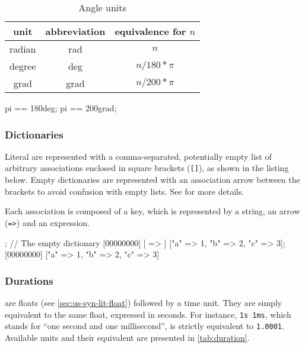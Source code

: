 \begin{table}[\floatposh]
  \centering
  \begin{tabular}{|c|c|c|}
    \hline
    unit        & abbreviation & equivalence for $n$  \\
    \hline
    radian      & rad          & $n$         \\
    degree      & deg          & $n / 180 * \pi$        \\
    grad        & grad         & $n / 200 * \pi$        \\
    \hline
  \end{tabular}
  \caption{Angle units}
  \label{tab:angle}
\end{table}

\begin{urbiassert}
pi == 180deg;
pi == 200grad;
\end{urbiassert}

\subsubsection{Dictionaries}
\label{sec:us-syn-lit-dictionary}

Literal  are represented with a comma-separated,
potentially empty list of arbitrary associations enclosed in square brackets
(\lstinline|[]|), as shown in the listing below.  Empty dictionaries are
represented with an association arrow between the brackets to avoid
confusion with empty lists.  See  for more details.

Each association is composed of a key, which is represented by a string, an
arrow (\lstinline|=>|) and an expression.

\begin{urbiscript}
[ => ]; // The empty dictionary
[00000000] [ => ]
["a" => 1, "b" => 2, "c" => 3];
[00000000] ["a" => 1, "b" => 2, "c" => 3]
\end{urbiscript}

\subsubsection{Durations}

 are floats (see \autoref{sec:us-syn-lit-float})
followed by a time unit. They are simply equivalent to the same float,
expressed in seconds. For instance, \lstinline|1s 1ms|, which stands
for ``one second and one millisecond'', is strictly equivalent to
\lstinline|1.0001|. Available units and their equivalent are presented
in \autoref{tab:duration}.

